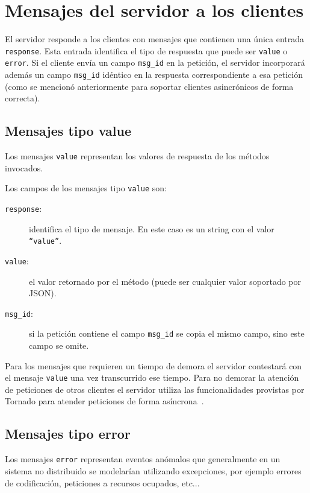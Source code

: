 \section{Mensajes del servidor a los clientes}

El servidor responde a los clientes con mensajes que contienen una única
entrada \texttt{response}. Esta entrada identifica el tipo de respuesta
que puede ser \texttt{value} o \texttt{error}. Si el cliente envía un
campo \texttt{msg\_id} en la petición, el servidor incorporará además
un campo \texttt{msg\_id} idéntico en la respuesta correspondiente
a esa petición (como se mencionó anteriormente para soportar
clientes asincrónicos de forma correcta).

\subsection{Mensajes tipo value}

Los mensajes \texttt{value} representan los valores de respuesta de
los métodos invocados.

Los campos de los mensajes tipo \texttt{value} son:

\begin{description}
    \item[\texttt{response}:] identifica el tipo de mensaje. En este caso
        es un string con el valor \texttt{``value''}.
    \item[\texttt{value}:] el valor retornado por el método (puede ser
        cualquier valor soportado por JSON).
    \item[\texttt{msg\_id}:] si la petición contiene el campo \texttt{msg\_id} se
        copia el mismo campo, sino este campo se omite.
\end{description}

Para los mensajes que requieren
un tiempo de demora el servidor contestará con el mensaje \texttt{value}
una vez transcurrido ese tiempo. Para no demorar la atención de peticiones
de otros clientes el servidor utiliza las funcionalidades provistas por
Tornado para atender peticiones de forma asíncrona~\citep{dory_2012}.

\subsection{Mensajes tipo error}

Los mensajes \texttt{error} representan eventos anómalos que
generalmente en un sistema no distribuido se modelarían utilizando
excepciones, por ejemplo errores de codificación, peticiones a recursos
ocupados, etc...

